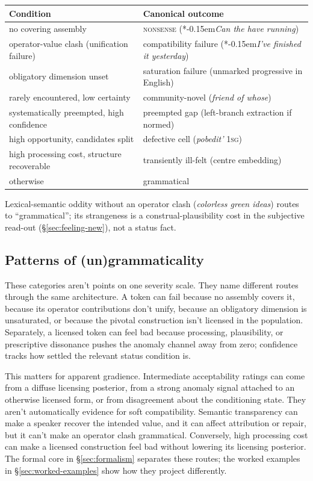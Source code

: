 \documentclass[12pt,letterpaper]{article}
\newcommand{\term}[1]{\textsc{#1}}
\newcommand{\mention}[1]{\textit{#1}}
\newcommand{\abbr}[1]{\textsc{#1}}
\newcommand{\judgesep}{\kern-0.15em}
\newcommand{\ungram}[1]{*\judgesep#1}
\begin{document}
\begin{center}
\small
\begin{tabular}{@{}l@{\;$\longrightarrow$\;}l@{}}
\toprule
Condition & Canonical outcome\\
\midrule
no covering assembly &
\term{nonsense} (\ungram{\mention{Can the have running}})\\[4pt]
operator-value clash (unification failure) &
compatibility failure (\ungram{\mention{I've finished it yesterday}})\\[4pt]
obligatory dimension unset &
saturation failure (unmarked progressive in English)\\[4pt]
rarely encountered, low certainty &
community-novel (\mention{friend of whose})\\[4pt]
systematically preempted, high confidence &
preempted gap (left-branch extraction if normed)\\[4pt]
high opportunity, candidates split &
defective cell (\mention{pobedit'} \abbr{1sg})\\[4pt]
high processing cost, structure recoverable &
transiently ill-felt (centre embedding)\\[4pt]
otherwise &
grammatical\\
\bottomrule
\end{tabular}
\end{center}

Lexical-semantic oddity without an operator clash (\mention{colorless green
ideas}) routes to \enquote{grammatical}; its strangeness is a
construal-plausibility cost in the subjective read-out
(\S\ref{sec:feeling-new}), not a status fact.


\subsection{Patterns of (un)grammaticality}\label{sec:patterns}

These categories aren't points on one severity scale. They name different routes
through the same architecture. A token can fail because no
assembly covers it, because its operator contributions don't unify, because an
obligatory dimension is unsaturated, or because the pivotal construction isn't
licensed in the population. Separately, a licensed token can feel bad because
processing, plausibility, or prescriptive dissonance pushes the anomaly channel
away from zero; confidence tracks how settled the relevant status condition is.

This matters for apparent gradience. Intermediate acceptability ratings can come from a diffuse licensing posterior, from a strong anomaly signal attached to an otherwise licensed form, or from disagreement about the conditioning state. They aren't automatically evidence for soft compatibility. Semantic transparency can make a speaker recover the intended value, and it can affect attribution or repair, but it can't make an operator clash grammatical. Conversely, high processing cost can make a licensed construction feel bad without lowering its licensing posterior. The formal core in \S\ref{sec:formalism} separates these routes; the worked examples in \S\ref{sec:worked-examples} show how they project differently.
\end{document}
